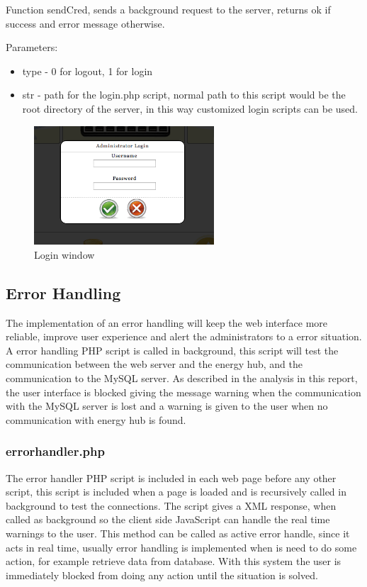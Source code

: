 Function sendCred, sends a background request to the server, returns ok if success and error message otherwise. 

Parameters:
\begin{itemize}
	\item type - 0 for logout, 1 for login
	\item str - path for the login.php script, normal path to this script would be the root directory of the server, in this way customized login scripts can be used.
\end{itemize}

\begin{figure}[H]
		\begin{centering}
			\includegraphics[width=0.6\textwidth]{images/login.png}
			\caption{Login window}
		\end{centering}
\end{figure}

\subsection{Error Handling}
The implementation of an error handling will keep the web interface more reliable, improve user experience and alert the administrators to a error situation. A error handling PHP script is called in background, this script will test the communication between the web server and the energy hub, and the communication to the MySQL server. As described in the analysis in this report, the user interface is blocked giving the message warning when the communication with the MySQL server is lost and a warning is given to the user when no communication with energy hub is found.

\subsubsection{errorhandler.php} The error handler PHP script is included in each web page before any other script, this script is included when a page is loaded and is recursively called in background to test the connections. The script gives a XML response, when called as background so the client side JavaScript can handle the real time warnings to the user. This method can be called as active error handle, since it acts in real time, usually error handling is implemented when is need to do some action, for example retrieve data from database. With this system the user is immediately blocked from doing any action until the situation is solved.

